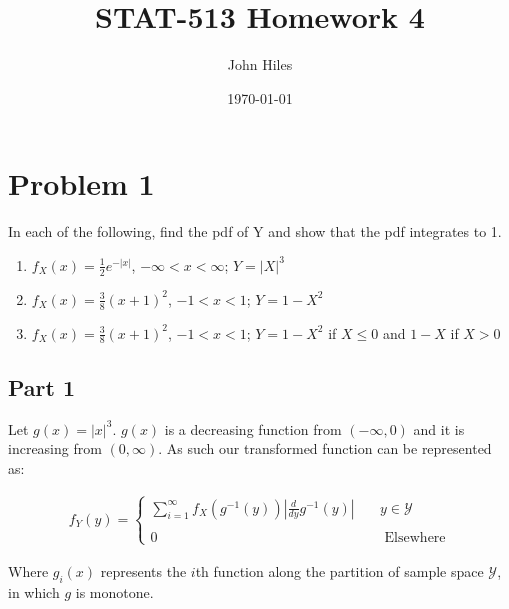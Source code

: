 \documentclass{article}
\title{STAT-513 Homework 4}
\author{John Hiles}
\date\today
\begin{document}
\maketitle %


\section*{Problem 1}
In each of the following, find the pdf of Y and show that the pdf integrates to 1.
\begin{enumerate}
\item
$f_X(x)=\frac{1}{2}e^{-|x|}$, $-\infty < x < \infty$; $Y = |X|^3$
\item
$f_X(x)=\frac{3}{8}(x+1)^2$, $-1 < x < 1$; $Y = 1-X^2$
\item
$f_X(x)=\frac{3}{8}(x+1)^2$, $-1 < x < 1$; $Y = 1-X^2$ if $X\leq 0$ and $1-X$ if $X>0$
\end{enumerate}

\subsection*{Part 1}
Let $g(x) = |x|^3$. $g(x)$ is a decreasing function from $(-\infty,0)$ and it is increasing from $(0,\infty)$. As such our transformed function can be represented as:

\begin{align*}
f_Y(y) = \left\{
        \begin{array}{ll}
            \sum_{i=1}^{\infty} f_X(g^{-1}(y))|\frac{d}{dy}g^{-1}(y)| & \quad y\in \mathcal{Y} \\
            \\
            0 & \quad \text{ Elsewhere} 
        \end{array}
    \right.
\end{align*}

Where $g_i(x)$ represents the $i$th function along the partition of sample space $\mathcal{Y}$, in which $g$ is monotone.
\end{document}
